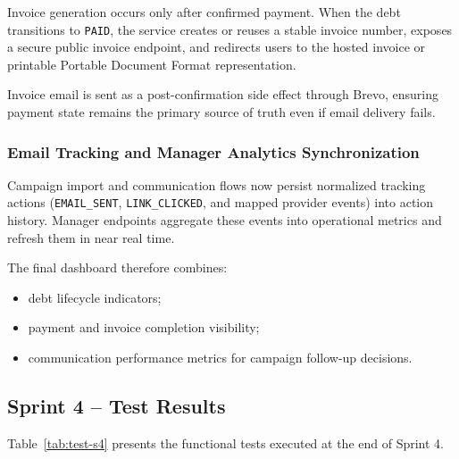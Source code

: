 \documentclass[12pt,a4paper]{report}
\begin{document}
Invoice generation occurs only after confirmed payment.
When the debt transitions to \texttt{PAID}, the service creates or reuses a stable
invoice number, exposes a secure public invoice endpoint, and redirects users to the
hosted invoice or printable Portable Document Format representation.

Invoice email is sent as a post-confirmation side effect through Brevo,
ensuring payment state remains the primary source of truth even if email delivery fails.

\subsubsection{Email Tracking and Manager Analytics Synchronization}

Campaign import and communication flows now persist normalized tracking actions
(\texttt{EMAIL\_SENT}, \texttt{LINK\_CLICKED}, and mapped provider events) into action history.
Manager endpoints aggregate these events into operational metrics and refresh them in near real time.

The final dashboard therefore combines:
\begin{itemize}
  \item debt lifecycle indicators;
  \item payment and invoice completion visibility;
  \item communication performance metrics for campaign follow-up decisions.
\end{itemize}

\subsection{Sprint 4 -- Test Results}

Table~\ref{tab:test-s4} presents the functional tests executed at the end of Sprint 4.
\end{document}
